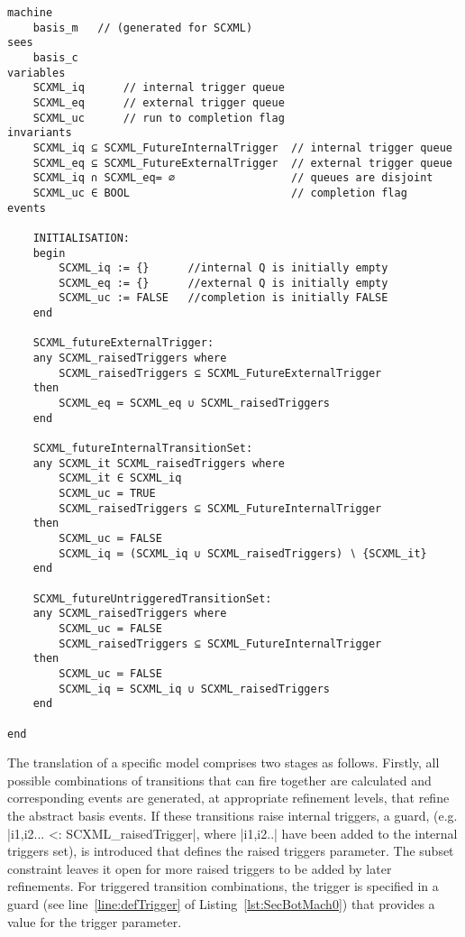 \begin{lstfloat}[!tb]
\begin{lstlisting}[caption={Abstract basis machine (part of)}, label={lst:BasisMachine},language=Event-B, escapechar=|, frame=single, basicstyle=\rmfamily\scriptsize]
machine 
	basis_m   // (generated for SCXML)
sees 
	basis_c 
variables
	SCXML_iq	  // internal trigger queue
	SCXML_eq	  // external trigger queue
	SCXML_uc	  // run to completion flag
invariants
	SCXML_iq ⊆ SCXML_FutureInternalTrigger	// internal trigger queue
	SCXML_eq ⊆ SCXML_FutureExternalTrigger	// external trigger queue
	SCXML_iq ∩ SCXML_eq= ∅					// queues are disjoint
	SCXML_uc ∈ BOOL							// completion flag
events

	INITIALISATION: 
	begin
		SCXML_iq := {}		//internal Q is initially empty
		SCXML_eq := {}		//external Q is initially empty
		SCXML_uc := FALSE	//completion is initially FALSE
	end

	SCXML_futureExternalTrigger: 
	any SCXML_raisedTriggers where
		SCXML_raisedTriggers ⊆ SCXML_FutureExternalTrigger 
	then
		SCXML_eq ≔ SCXML_eq ∪ SCXML_raisedTriggers 
	end

	SCXML_futureInternalTransitionSet: 
	any SCXML_it SCXML_raisedTriggers where
		SCXML_it ∈ SCXML_iq 
		SCXML_uc = TRUE 
		SCXML_raisedTriggers ⊆ SCXML_FutureInternalTrigger 
	then
		SCXML_uc ≔ FALSE 
		SCXML_iq ≔ (SCXML_iq ∪ SCXML_raisedTriggers) ∖ {SCXML_it} 
	end

	SCXML_futureUntriggeredTransitionSet: 
	any SCXML_raisedTriggers where
		SCXML_uc = FALSE
		SCXML_raisedTriggers ⊆ SCXML_FutureInternalTrigger
	then
		SCXML_uc ≔ FALSE 
		SCXML_iq ≔ SCXML_iq ∪ SCXML_raisedTriggers 
	end

end
\end{lstlisting}
\end{lstfloat}

The translation of a specific \SCXML model comprises two stages as follows. 
Firstly, all possible combinations of transitions that can fire together are calculated and corresponding events are generated, at appropriate refinement levels, that refine the abstract basis events.  
If these transitions raise internal triggers, a guard, (e.g. |{i1,i2...} <: SCXML_raisedTrigger|, where |i1,i2..| have been added to the internal triggers set), is introduced that defines the raised triggers parameter. 
The subset constraint leaves it open for more raised triggers to be added by later refinements.
For triggered transition combinations, the trigger is specified in a guard (see line~\ref{line:defTrigger} of Listing~\ref{lst:SecBotMach0}) that provides a value for the trigger parameter. 

